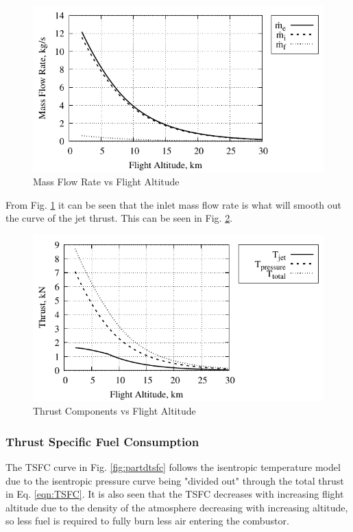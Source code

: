 \documentclass[conf]{new-aiaa} %
\begin{document}
\begin{figure}[H] %
    \centering
    \includegraphics[]{media/performance_parameter_files/part_d_mass_flow_rate.pdf}
    \caption{\label{fig:partdmassflowrate}Mass Flow Rate vs Flight Altitude}
\end{figure}
From Fig. \ref{fig:partdmassflowrate} it can be seen that the inlet mass flow rate is what will smooth out the curve of the jet thrust. This can be seen in Fig. \ref{fig:partdallthrust}.

\begin{figure}[H] %
    \centering
    \includegraphics[]{media/performance_parameter_files/part_d_all_thrust.pdf}
    \caption{\label{fig:partdallthrust}Thrust Components vs Flight Altitude}
\end{figure}

\subsubsection{Thrust Specific Fuel Consumption}
The TSFC curve in Fig. \ref{fig:partdtsfc} follows the isentropic temperature model due to the isentropic pressure curve being "divided out" through the total thrust in Eq. \ref{eqn:TSFC}. It is also seen that the TSFC decreases with increasing flight altitude due to the density of the atmosphere decreasing with increasing altitude, so less fuel is required to fully burn less air entering the combustor.
\end{document}
